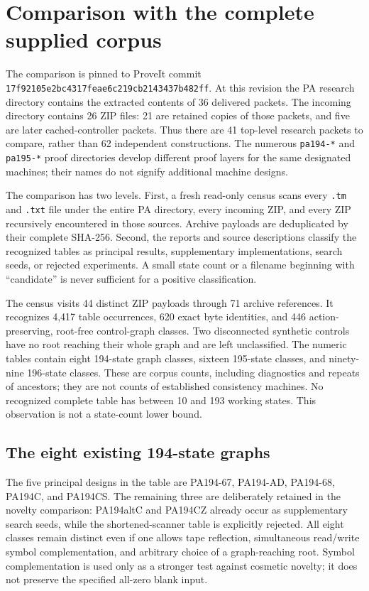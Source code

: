 \section{Comparison with the complete supplied corpus}
\label{sec:corpus-review}

The comparison is pinned to ProveIt commit
\nolinkurl{17f92105e2bc4317feae6c219cb2143437b482ff}.
At this revision the PA research directory contains the extracted contents
of 36 delivered packets. The incoming directory contains 26 ZIP files:
21 are retained copies of those packets, and five are later cached-controller
packets. Thus there are 41 top-level research packets to compare, rather
than 62 independent constructions. The numerous
\nolinkurl{pa194-*} and \nolinkurl{pa195-*} proof directories develop
different proof layers for the same designated machines; their names do
not signify additional machine designs.

The comparison has two levels. First, a fresh read-only census scans every
\nolinkurl{.tm} and \nolinkurl{.txt} file under the entire PA directory,
every incoming ZIP, and every ZIP recursively encountered in those sources.
Archive payloads are deduplicated by their complete SHA-256. Second, the
reports and source descriptions classify the recognized tables as principal
results, supplementary implementations, search seeds, or rejected
experiments. A small state count or a filename beginning with ``candidate''
is never sufficient for a positive classification.

The census visits 44 distinct ZIP payloads through 71 archive references.
It recognizes 4,417 table occurrences, 620 exact byte identities, and 446
action-preserving, root-free control-graph classes. Two disconnected
synthetic controls have no root reaching their whole graph and are left
unclassified. The numeric tables contain eight 194-state graph classes,
sixteen 195-state classes, and ninety-nine 196-state classes. These are
corpus counts, including diagnostics and repeats of ancestors; they are
not counts of established consistency machines. No recognized complete
table has between 10 and 193 working states. This observation is not a
state-count lower bound.

\subsection{The eight existing 194-state graphs}



The five principal designs in the table are PA194-67, PA194-AD, PA194-68,
PA194C, and PA194CS. The remaining three are deliberately retained in the
novelty comparison: PA194altC and PA194CZ already occur as supplementary
search seeds, while the shortened-scanner table is explicitly rejected.
All eight classes remain distinct even if one allows tape reflection,
simultaneous read/write symbol complementation, and arbitrary choice of
a graph-reaching root. Symbol complementation is used only as a stronger
test against cosmetic novelty; it does not preserve the specified all-zero
blank input.


